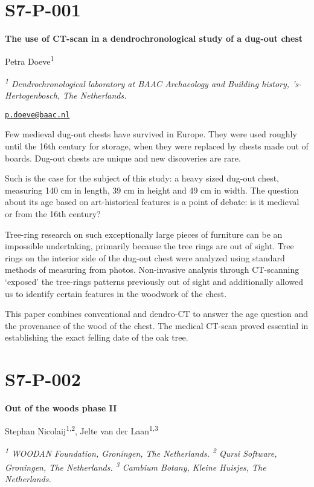 \documentclass[
]{book}
\begin{document}
\hypertarget{s7-p-001}{%
\section*{S7-P-001}\label{s7-p-001}}

\textbf{The use of CT-scan in a dendrochronological study of a dug-out chest}

Petra Doeve\textsuperscript{1}

\emph{\textsuperscript{1} Dendrochronological laboratory at BAAC Archaeology and Building history, 's-Hertogenbosch, The Netherlands.}

\href{mailto:p.doeve@baac.nl}{\nolinkurl{p.doeve@baac.nl}}

Few medieval dug-out chests have survived in Europe. They were used roughly until the 16th century for storage, when they were replaced by chests made out of boards. Dug-out chests are unique and new discoveries are rare.

Such is the case for the subject of this study: a heavy sized dug-out chest, measuring 140 cm in length, 39 cm in height and 49 cm in width. The question about its age based on art-historical features is a point of debate: is it medieval or from the 16th century?

Tree-ring research on such exceptionally large pieces of furniture can be an impossible undertaking, primarily because the tree rings are out of sight. Tree rings on the interior side of the dug-out chest were analyzed using standard methods of measuring from photos. Non-invasive analysis through CT-scanning `exposed' the tree-rings patterns previously out of sight and additionally allowed us to identify certain features in the woodwork of the chest.

This paper combines conventional and dendro-CT to answer the age question and the provenance of the wood of the chest. The medical CT-scan proved essential in establishing the exact felling date of the oak tree.

\hypertarget{s7-p-002}{%
\section*{S7-P-002}\label{s7-p-002}}

\textbf{Out of the woods phase II}

Stephan Nicolaij\textsuperscript{1,2}, Jelte van der Laan\textsuperscript{1,3}

\emph{\textsuperscript{1} WOODAN Foundation, Groningen, The Netherlands. \textsuperscript{2} Qursi Software, Groningen, The Netherlands. \textsuperscript{3} Cambium Botany, Kleine Huisjes, The Netherlands.}
\end{document}
